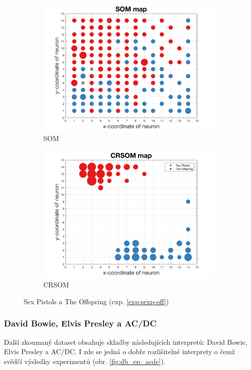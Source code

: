 \documentclass[thesis=M,czech]{FITthesis}[2012/06/26]
\begin{document}
\begin{figure}
\centering
\begin{subfigure}{.5\textwidth}
  \centering
  \includegraphics[width=.99\linewidth]{exp_sexp_off_som.png}
  \caption{SOM}
  \label{fig:sexp_off_som}
\end{subfigure}%
\begin{subfigure}{.5\textwidth}
  \centering
  \includegraphics[width=.99\linewidth]{exp_sexp_off_crsom.png}
  \caption{CRSOM}
  \label{fig:sub2}
\end{subfigure}
\caption{Sex Pistols a The Offspring (exp. \ref{exp:sexp-off})}
\label{fig:sexp_off_crsom}
\end{figure}

\subsubsection*{David Bowie, Elvis Presley a AC/DC}
Další zkoumaný dataset obsahuje skladby následujících interpretů: David Bowie, Elvis Presley a AC/DC. I zde se jedná o dobře rozlišitelné interprety o čemž svědčí výsledky experimentů (obr. \ref{fig:db_ep_acdc}).
\end{document}
